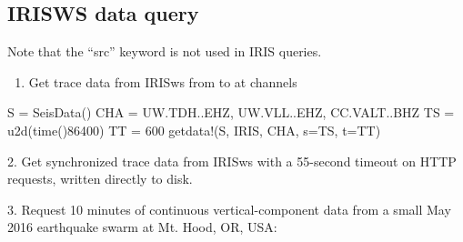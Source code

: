 \documentclass[letterpaper,11pt,english]{sphinxmanual}
\begin{document}
\subsection{IRISWS data query}
\label{\detokenize{src/Appendices/examples:irisws-data-query}}
Note that the “src” keyword is not used in IRIS queries.
\begin{enumerate}
\def\theenumi{\arabic{enumi}}
\def\labelenumi{\theenumi .}
\makeatletter\def\p@enumii{\p@enumi \theenumi .}\makeatother
\item {} 
Get trace data from IRISws from  to  at channels 

\end{enumerate}

%
\begin{sphinxVerbatim}[commandchars=\\\{\}]
S = SeisData()
CHA = \PYGZdq{}UW.TDH..EHZ, UW.VLL..EHZ, CC.VALT..BHZ\PYGZdq{}
TS = u2d(time()\PYGZhy{}86400)
TT = 600
get\PYGZus{}data!(S, \PYGZdq{}IRIS\PYGZdq{}, CHA, s=TS, t=TT)
\end{sphinxVerbatim}

2. Get synchronized trace data from IRISws with a 55-second timeout on HTTP requests, written directly to disk.

%
\begin{sphinxVerbatim}[commandchars=\\\{\}]
  
  
  
        
\end{sphinxVerbatim}

3. Request 10 minutes of continuous vertical-component data from a small May 2016 earthquake swarm at Mt. Hood, OR, USA:

%
\begin{sphinxVerbatim}[commandchars=\\\{\}]
  
     
      
\end{sphinxVerbatim}
\end{document}
